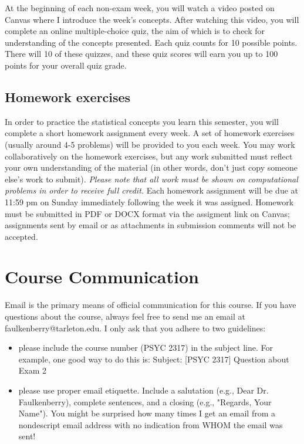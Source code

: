\documentclass[10pt]{article}
\begin{document}
At the beginning of each non-exam week, you will watch a video posted on Canvas where I introduce the week's concepts. After watching this video, you will complete an online multiple-choice quiz, the aim of which is to check for understanding of the concepts presented. Each quiz counts for 10 possible points. There will 10 of these quizzes, and these quiz scores will earn you up to 100 points for your overall quiz grade.

\subsection*{Homework exercises}
\label{sec:org99d1faf}
In order to practice the statistical concepts you learn this semester, you will complete a short homework assignment every week. A set of homework exercises (usually around 4-5 problems) will be provided to you each week. You may work collaboratively on the homework exercises, but any work submitted must reflect your own understanding of the material (in other words, don't just copy someone else's work to submit). \emph{Please note that all work must be shown on computational problems in order to receive full credit.} Each homework assignment will be due at 11:59 pm on Sunday immediately following the week it was assigned. Homework must be submitted in PDF or DOCX format via the assigment link on Canvas; assignments sent by email or as attachments in submission comments will not be accepted.

\section*{Course Communication}
\label{sec:orgb62eb78}

Email is the primary means of official communication for this course.  If you have questions about the course, always feel free to send me an email at faulkenberry@tarleton.edu.  I only ask that you adhere to two guidelines:
\begin{itemize}
\item please include the course number (PSYC 2317) in the subject line.  For example, one good way to do this is:  Subject: [PSYC 2317] Question about Exam 2
\item please use proper email etiquette.  Include a salutation (e.g., Dear Dr. Faulkenberry), complete sentences, and a closing (e.g., "Regards, Your Name").  You might be surprised how many times I get an email from a nondescript email address with no indication from WHOM the email was sent!
\end{itemize}
\end{document}
